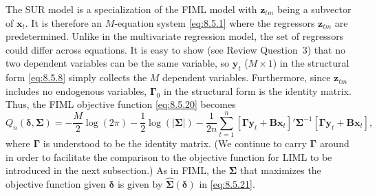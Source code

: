 The SUR model is a specialization of the FIML model with $\mathbf{z}_{tm}$ being a subvector
of $\mathbf{x}_t$. It is therefore an $M$-equation system \eqref{eq:8.5.1} where the regressors $\mathbf{z}_{tm}$ are
predetermined. Unlike in the multivariate regression model, the set of regressors
could differ across equations. It is easy to show (see Review Question~3) that no
two dependent variables can be the same variable, so $\mathbf{y}_t$ ($M \times 1$) in the structural
form \eqref{eq:8.5.8} simply collects the $M$ dependent variables. Furthermore, since $\mathbf{z}_{tm}$
includes no endogenous variables, $\boldsymbol{\Gamma}_0$ in the structural form is the identity matrix.
Thus, the FIML objective function \eqref{eq:8.5.20} becomes
\begin{equation}
  Q_n(\boldsymbol{\delta}, \boldsymbol{\Sigma})
  = -\frac{M}{2}\log(2\pi)
    - \frac{1}{2}\log(|\boldsymbol{\Sigma}|)
    - \frac{1}{2n}\sum_{t=1}^{n}
      [\boldsymbol{\Gamma}\mathbf{y}_t + \mathbf{B}\mathbf{x}_t]'
      \boldsymbol{\Sigma}^{-1}
      [\boldsymbol{\Gamma}\mathbf{y}_t + \mathbf{B}\mathbf{x}_t],
  \label{eq:8.5.29} \tag{8.5.29}
\end{equation}
where $\boldsymbol{\Gamma}$ is understood to be the identity matrix. (We continue to carry $\boldsymbol{\Gamma}$ around
in order to facilitate the comparison to the objective function for LIML to be introduced in the next subsection.) As in FIML, the $\boldsymbol{\Sigma}$ that maximizes the objective
function given $\boldsymbol{\delta}$ is given by $\hat{\boldsymbol{\Sigma}}(\boldsymbol{\delta})$ in \eqref{eq:8.5.21}.

